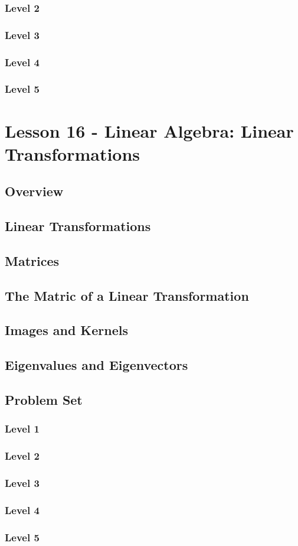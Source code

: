 \documentclass{article}
\begin{document}
\subsubsection{Level 2}
\subsubsection{Level 3}
\subsubsection{Level 4}
\subsubsection{Level 5}
\pagebreak

\section{Lesson 16 - Linear Algebra: Linear Transformations}
\subsection{Overview}
\subsection{Linear Transformations}
\subsection{Matrices}
\subsection{The Matric of a Linear Transformation}
\subsection{Images and Kernels}
\subsection{Eigenvalues and Eigenvectors}
\subsection{Problem Set}
\subsubsection{Level 1}
\subsubsection{Level 2}
\subsubsection{Level 3}
\subsubsection{Level 4}
\subsubsection{Level 5}
\pagebreak
\end{document}
